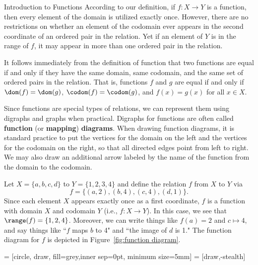 \begin{section}{Introduction to Functions}
According to our definition, if $f:X\to Y$ is a function, then every element of the domain is utilized exactly once. However, there are no restrictions on whether an element of the codomain ever appears in the second coordinate of an ordered pair in the relation.  Yet if an element of $Y$ is in the range of $f$, it may appear in more than one ordered pair in the relation.

It follows immediately from the definition of function that two functions are equal if and only if they have the same domain, same codomain, and the same set of ordered pairs in the relation. That is, functions $f$ and $g$ are equal if and only if $\dom(f)=\dom(g)$, $\codom(f)=\codom(g)$, and $f(x)=g(x)$ for all $x\in X$.

Since functions are special types of relations, we can represent them using digraphs and graphs when practical. Digraphs for functions are often called \textbf{function} (or \textbf{mapping}) \textbf{diagrams}. When drawing function diagrams, it is standard practice to put the vertices for the domain on the left and the vertices for the codomain on the right, so that all directed edges point from left to right. We may also draw an additional arrow labeled by the name of the function from the domain to the codomain.

\begin{example}\label{ex:function}
Let $X=\{a,b,c,d\}$ to $Y=\{1,2,3,4\}$ and define the relation $f$ from $X$ to $Y$ via
\[
f=\{(a,2),(b,4),(c,4),(d,1)\}.
\]
Since each element $X$ appears exactly once as a first coordinate, $f$ is a function with domain $X$ and codomain $Y$ (i.e., $f:X\to Y$). In this case, we see that $\range(f)=\{1,2,4\}$.  Moreover, we can write things like $f(a)=2$ and $c\mapsto 4$, and say things like ``$f$ maps $b$ to 4" and ``the image of $d$ is 1."  The function diagram for $f$ is depicted in Figure~\ref{fig:function diagram}.
\end{example}

 = [circle, draw, fill=grey,inner sep=0pt, minimum size=5mm]
 = [draw,-stealth]

\begin{figure}[h!]
\begin{center}
\end{center}
\end{figure}
\end{section}
